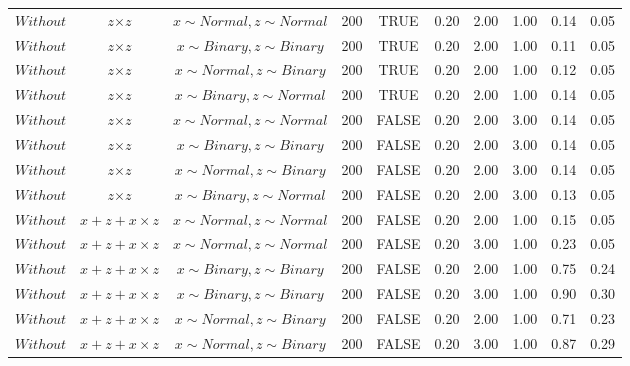 \begin{longtable}{lccccccccc}
  $Without$ & $\textit{z} \times \textit{z}$ & $\textit{x} \sim Normal , \textit{z} \sim Normal$ & 200 & TRUE & 0.20 & 2.00 & 1.00 & 0.14 & 0.05 \\ 
  $Without$ & $\textit{z} \times \textit{z}$ & $\textit{x} \sim Binary, \textit{z} \sim Binary$ & 200 & TRUE & 0.20 & 2.00 & 1.00 & 0.11 & 0.05 \\ 
  $Without$ & $\textit{z} \times \textit{z}$ & $\textit{x} \sim Normal, \textit{z} \sim Binary$ & 200 & TRUE & 0.20 & 2.00 & 1.00 & 0.12 & 0.05 \\ 
  $Without$ & $\textit{z} \times \textit{z}$ & $\textit{x} \sim Binary, \textit{z} \sim Normal$ & 200 & TRUE & 0.20 & 2.00 & 1.00 & 0.14 & 0.05 \\ 
  $Without$ & $\textit{z} \times \textit{z}$ & $\textit{x} \sim Normal , \textit{z} \sim Normal$ & 200 & FALSE & 0.20 & 2.00 & 3.00 & 0.14 & 0.05 \\ 
  $Without$ & $\textit{z} \times \textit{z}$ & $\textit{x} \sim Binary, \textit{z} \sim Binary$ & 200 & FALSE & 0.20 & 2.00 & 3.00 & 0.14 & 0.05 \\ 
  $Without$ & $\textit{z} \times \textit{z}$ & $\textit{x} \sim Normal, \textit{z} \sim Binary$ & 200 & FALSE & 0.20 & 2.00 & 3.00 & 0.14 & 0.05 \\ 
  $Without$ & $\textit{z} \times \textit{z}$ & $\textit{x} \sim Binary, \textit{z} \sim Normal$ & 200 & FALSE & 0.20 & 2.00 & 3.00 & 0.13 & 0.05 \\ 
  $Without$ & $\textit{x} + \textit{z} + \textit{x} \times \textit{z}$ & $\textit{x} \sim Normal , \textit{z} \sim Normal$ & 200 & FALSE & 0.20 & 2.00 & 1.00 & 0.15 & 0.05 \\ 
  $Without$ & $\textit{x} + \textit{z} + \textit{x} \times \textit{z}$ & $\textit{x} \sim Normal , \textit{z} \sim Normal$ & 200 & FALSE & 0.20 & 3.00 & 1.00 & 0.23 & 0.05 \\ 
  $Without$ & $\textit{x} + \textit{z} + \textit{x} \times \textit{z}$ & $\textit{x} \sim Binary, \textit{z} \sim Binary$ & 200 & FALSE & 0.20 & 2.00 & 1.00 & 0.75 & 0.24 \\ 
  $Without$ & $\textit{x} + \textit{z} + \textit{x} \times \textit{z}$ & $\textit{x} \sim Binary, \textit{z} \sim Binary$ & 200 & FALSE & 0.20 & 3.00 & 1.00 & 0.90 & 0.30 \\ 
  $Without$ & $\textit{x} + \textit{z} + \textit{x} \times \textit{z}$ & $\textit{x} \sim Normal, \textit{z} \sim Binary$ & 200 & FALSE & 0.20 & 2.00 & 1.00 & 0.71 & 0.23 \\ 
  $Without$ & $\textit{x} + \textit{z} + \textit{x} \times \textit{z}$ & $\textit{x} \sim Normal, \textit{z} \sim Binary$ & 200 & FALSE & 0.20 & 3.00 & 1.00 & 0.87 & 0.29 \\ 

\end{longtable}
